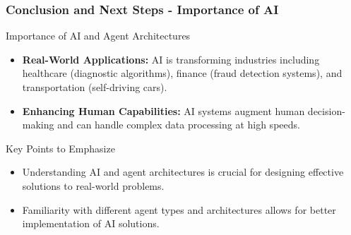 \documentclass[aspectratio=169]{beamer}
\begin{document}
\begin{frame}[fragile]
    \frametitle{Conclusion and Next Steps - Importance of AI}
    \begin{block}{Importance of AI and Agent Architectures}
        \begin{itemize}
            \item \textbf{Real-World Applications:} AI is transforming industries including healthcare (diagnostic algorithms), finance (fraud detection systems), and transportation (self-driving cars).
            \item \textbf{Enhancing Human Capabilities:} AI systems augment human decision-making and can handle complex data processing at high speeds.
        \end{itemize}
    \end{block}
    
    \begin{block}{Key Points to Emphasize}
        \begin{itemize}
            \item Understanding AI and agent architectures is crucial for designing effective solutions to real-world problems.
            \item Familiarity with different agent types and architectures allows for better implementation of AI solutions.
        \end{itemize}
    \end{block}
\end{frame}
\end{document}
